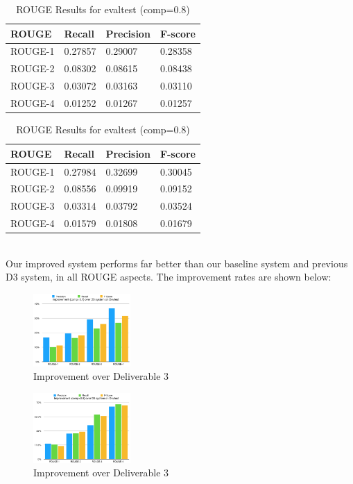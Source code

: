 \documentclass[11pt]{article}
\begin{document}
\begin{table}[!ht]
\centering
\caption{ROUGE Results for devtest (comp=0.8)}
\begin{tabular}{|l|l|l|l|}
\hline
ROUGE   & Recall  & Precision & F-score \\ \hline
ROUGE-1 & 0.27857 & 0.29007   & 0.28358 \\ \hline
ROUGE-2 & 0.08302 & 0.08615   & 0.08438 \\ \hline
ROUGE-3 & 0.03072 & 0.03163   & 0.03110 \\ \hline
ROUGE-4 & 0.01252 & 0.01267   & 0.01257 \\ \hline
\end{tabular}
\caption{ROUGE Results for evaltest (comp=0.8)}
\begin{tabular}{|l|l|l|l|}
\hline
ROUGE   & Recall  & Precision & F-score \\ \hline
ROUGE-1 & 0.27984 & 0.32699   & 0.30045 \\ \hline
ROUGE-2 & 0.08556 & 0.09919   & 0.09152 \\ \hline
ROUGE-3 & 0.03314 & 0.03792   & 0.03524 \\ \hline
ROUGE-4 & 0.01579 & 0.01808   & 0.01679 \\ \hline
\end{tabular}
\end{table}\\
Our improved system performs far better than our baseline system and previous D3 system, in all ROUGE aspects. The improvement rates are shown below:
\begin{figure}[!ht]
\begin{center}
\includegraphics[width=0.33\textwidth]{perc_d4.png}
\caption{Improvement over Deliverable 3}
\end{center}
\end{figure}
\begin{figure}[!ht]
\begin{center}
\includegraphics[width=0.33\textwidth]{perc_d4_2.png}
\caption{Improvement over Deliverable 3}
\end{center}
\end{figure}
\end{document}
